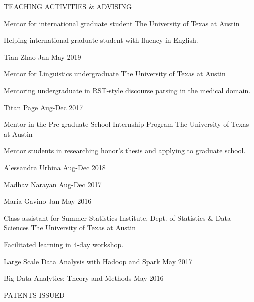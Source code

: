 \documentclass{resume} %
\begin{document}
\begin{rSection}{TEACHING ACTIVITIES \& ADVISING} \itemsep -1pt {}
\vspace{-0.7em}
\begin{rSubsection}{Mentor for international graduate student}{} 
{The University of Texas at Austin}{}
\item Helping international graduate student with fluency in English.
\item \hspace{4ex}Tian Zhao \hfill Jan-May 2019
\end{rSubsection}
\begin{rSubsection}{Mentor for Linguistics undergraduate}{} 
{The University of Texas at Austin}{}
\item Mentoring undergraduate in RST-style discourse parsing in the medical domain.
\item \hspace{4ex}Titan Page \hfill Aug-Dec 2017
\end{rSubsection}
\begin{rSubsection}{Mentor in the Pre-graduate School Internship Program}{} 
{The University of Texas at Austin}{}
\item Mentor students in researching honor's thesis and applying to graduate school.
\item \hspace{4ex}Alessandra Urbina \hfill Aug-Dec 2018
\item \hspace{4ex}Madhav Narayan \hfill Aug-Dec 2017
\item \hspace{4ex}Mar\'ia Gavino \hfill Jan-May 2016
\end{rSubsection}

\begin{rSubsection}{Class assistant for Summer Statistics Institute, Dept. of Statistics \& Data Sciences}{} 
{The University of Texas at Austin}{}
\item Facilitated learning in 4-day workshop.
\item \hspace{4ex}Large Scale Data Analysis with Hadoop and Spark \hfill May 2017
\item \hspace{4ex}Big Data Analytics: Theory and Methods \hfill May 2016
\end{rSubsection}

\end{rSection}
\begin{rSection}{PATENTS ISSUED}{}
\vspace{-5.5em}
\end{rSection}
\end{document}
